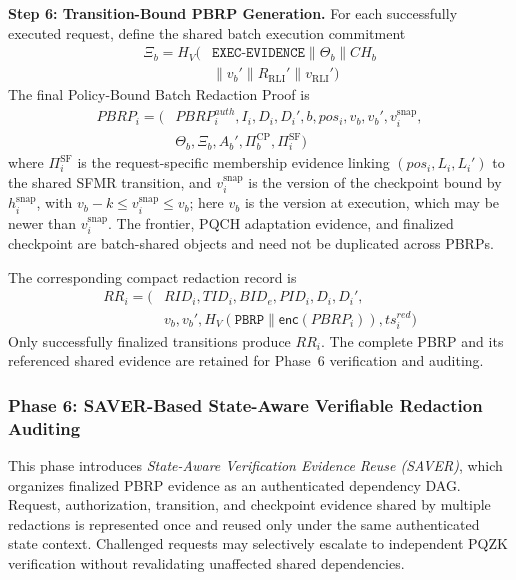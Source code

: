 \documentclass[lettersize,journal]{IEEEtran}
\begin{document}
\medskip
\noindent\textbf{Step 6: Transition-Bound PBRP Generation.}
For each successfully executed request, define the shared batch
execution commitment
\begin{equation}
\begin{aligned}
\Xi_b=
H_V\big(&\texttt{EXEC-EVIDENCE}\parallel
\Theta_b\parallel CH_b\\
&\parallel v_b'\parallel
R_{\mathrm{RLI}}'\parallel v_{\mathrm{RLI}}'\big)
\end{aligned}
\label{eq:xi}
\end{equation}
The final Policy-Bound Batch Redaction Proof is
\begin{equation}
\begin{aligned}
PBRP_i=\big(
&PBRP_i^{auth},I_i,D_i,D_i',
b,pos_i,v_b,v_b',v_i^{\mathrm{snap}},\\
&\Theta_b,\Xi_b,A_b',\Pi_b^{\mathrm{CP}},\Pi_i^{\mathrm{SF}}\big)
\end{aligned}
\label{eq:pbrp}
\end{equation}
where $\Pi_i^{\mathrm{SF}}$ is the request-specific membership evidence
linking $(pos_i,L_i,L_i')$ to the shared SFMR transition,
and $v_i^{\mathrm{snap}}$ is the version of the checkpoint bound by
$h_i^{\mathrm{snap}}$, with $v_b-k\le v_i^{\mathrm{snap}}\le v_b$; here
$v_b$ is the version at execution, which may be newer than
$v_i^{\mathrm{snap}}$. The frontier,
PQCH adaptation evidence, and finalized checkpoint are batch-shared
objects and need not be duplicated across PBRPs.

The corresponding compact redaction record is
\begin{equation}
\begin{aligned}
RR_i=\big(
&RID_i,TID_i,BID_e,PID_i,D_i,D_i',\\
&v_b,v_b',H_V(\texttt{PBRP}\parallel
\mathsf{enc}(PBRP_i)),ts_i^{red}\big)
\end{aligned}
\end{equation}
Only successfully finalized transitions produce $RR_i$. The complete
PBRP and its referenced shared evidence are retained for Phase~6
verification and auditing.


\subsubsection*{\textbf{Phase 6: SAVER-Based State-Aware
Verifiable Redaction Auditing}}

This phase introduces \emph{State-Aware Verification Evidence Reuse
(SAVER)}, which organizes finalized PBRP evidence as an authenticated
dependency DAG. Request, authorization, transition, and checkpoint
evidence shared by multiple redactions is represented once and reused
only under the same authenticated state context. Challenged requests
may selectively escalate to independent PQZK verification without
revalidating unaffected shared dependencies.
\end{document}
